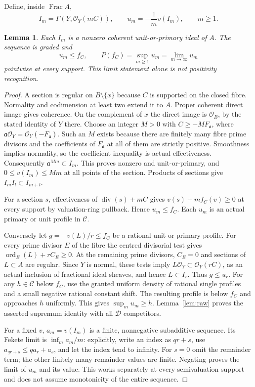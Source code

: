 \documentclass[11pt]{article}
\newtheorem{lemma}[theorem]{Lemma}
\newcommand{\cC}{\mathcal C}
\newcommand{\cD}{\mathcal D}
\newcommand{\OO}{\mathcal O}
\begin{document}
Define, inside $\operatorname{Frac} A$,
\[
 I_m=\Gamma(Y,\OO_Y(mC)),\qquad
 u_m=-\frac1m v(I_m),\qquad m\geq1.
\]
\begin{lemma}\label{lem:sections}
Each $I_m$ is a nonzero coherent unit-or-primary ideal of $A$. The
sequence is graded and
\[
 u_m\leq f_C,\qquad P(f_C)=\sup_{m\geq1}u_m
       =\lim_{m\to\infty}u_m
\]
pointwise at every support. This limit statement alone is not positivity
recognition.
\end{lemma}
\begin{proof}
A section is regular on $B\setminus\{x\}$ because $C$ is supported on
the closed fibre. Normality and codimension at least two extend it to
$A$. Proper coherent direct image gives coherence. On the complement of
$x$ the direct image is $\OO_B$, by the stated identity of $Y$ there.
Choose an integer $M>0$ with $C\geq-M F_{\mathfrak a}$, where
$\mathfrak a\OO_Y=\OO_Y(-F_{\mathfrak a})$. Such an $M$ exists because
there are finitely many fibre prime divisors and the coefficients of
$F_{\mathfrak a}$ at all of them are strictly positive. Smoothness implies
normality, so the coefficient inequality is actual effectiveness.
Consequently $\mathfrak a^{Mm}\subset I_m$. This proves nonzero and
unit-or-primary, and $0\leq v(I_m)\leq Mm$ at all points of the section.
Products of sections give $I_m I_l\subset I_{m+l}$.

For a section $s$, effectiveness of $\operatorname{div}(s)+mC$ gives
$v(s)+m f_C(v)\geq0$ at every support by valuation-ring pullback. Hence
$u_m\leq f_C$. Each $u_m$ is an actual primary or unit profile in $\cC$.

Conversely let $g=-v(L)/r\leq f_C$ be a rational unit-or-primary profile.
For every prime divisor $E$ of the fibre the centred divisorial test
gives $\operatorname{ord}_E(L)+r C_E\geq0$. At the remaining prime
divisors, $C_E=0$ and sections of $L\subset A$ are regular.
Since $Y$ is normal, these tests imply
$L\OO_Y\subset\OO_Y(rC)$, as an actual inclusion of fractional ideal
sheaves, and hence $L\subset I_r$. Thus $g\leq u_r$.
For any $h\in\cC$ below $f_C$, use the granted uniform density of rational
single profiles and a small negative rational constant shift. The resulting
profile is below $f_C$ and approaches $h$ uniformly. This gives
$\sup_m u_m\geq h$. Lemma~\ref{lem:raw} proves the asserted supremum
identity with all $\cD$ competitors.

For a fixed $v$, $a_m=v(I_m)$ is a finite, nonnegative subadditive
sequence. Its Fekete limit is $\inf_m a_m/m$: explicitly, write an index
as $qr+s$, use $a_{qr+s}\leq q a_r+a_s$, and let the index tend to
infinity. For $s=0$ omit the remainder term; the other finitely many
remainder values are finite. Negating proves the limit of $u_m$ and its
value. This works separately at every semivaluation support and does not
assume monotonicity of the entire sequence.
\end{proof}
\end{document}
